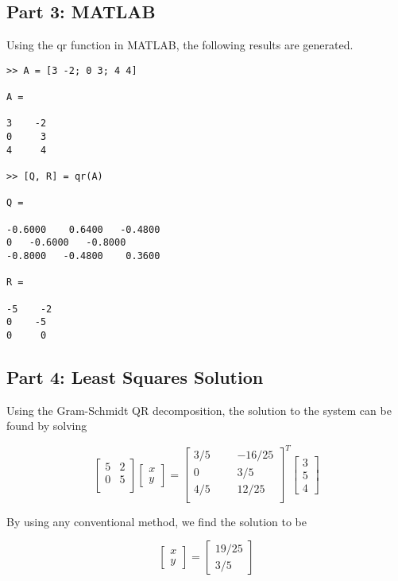 \documentclass[a4paper, 12pt, twoside]{article}
\begin{document}
\pagebreak

\subsection*{Part 3: MATLAB}

Using the qr function in MATLAB, the following results are generated.

\begin{verbatim}
>> A = [3 -2; 0 3; 4 4] 

A =

3    -2
0     3
4     4

>> [Q, R] = qr(A)

Q =

-0.6000    0.6400   -0.4800
0   -0.6000   -0.8000
-0.8000   -0.4800    0.3600

R =

-5    -2
0    -5
0     0

\end{verbatim}

\subsection{Part 4: Least Squares Solution}

Using the Gram-Schmidt QR decomposition, the solution to the system can be found by solving 

$$
\begin{bmatrix}
5 & 2 \\ 0 & 5\\
\end{bmatrix}
\begin{bmatrix} x \\ y \end{bmatrix}
= 
\begin{bmatrix}
3/5& & &-16/25\\
0 & & & 3/5\\
4/5& & & 12/25\\	
\end{bmatrix}^T
\begin{bmatrix} 3 \\ 5 \\ 4 \end{bmatrix}
$$

By using any conventional method, we find the solution to be

$$
\begin{bmatrix} x \\ y \end{bmatrix}
=
\begin{bmatrix} 19/25 \\ 3/5 \end{bmatrix}
$$
\end{document}
